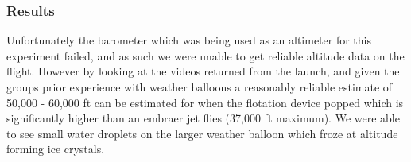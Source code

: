 \subsubsection{Results}
Unfortunately the barometer which was being used as an altimeter for this experiment failed, and as such we were unable to get reliable altitude data on the flight. However by looking at the videos returned from the launch, and given the groups prior experience with weather balloons a reasonably reliable estimate of 50,000 - 60,000 ft can be estimated for when the flotation device popped which is significantly higher than an embraer jet flies (37,000 ft maximum). We were able to see small water droplets on the larger weather balloon which froze at altitude forming ice crystals.

%
%
%
